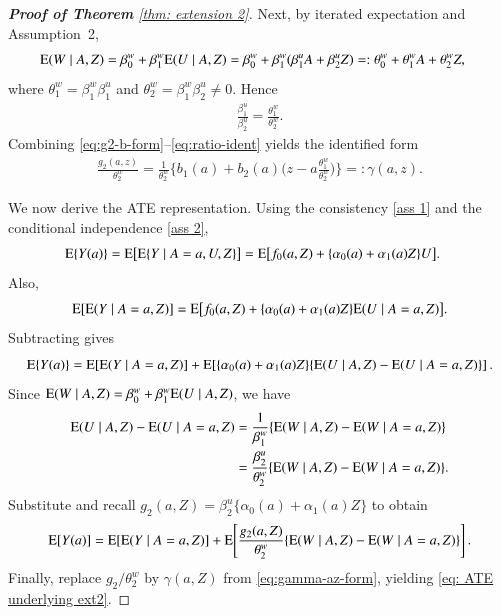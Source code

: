 \begin{proof}[\hypertarget{proof of thm extension 2}{\textbf{Proof of Theorem}} \ref{thm: extension 2}]
Next, by iterated expectation and Assumption~2,
\begin{align*}
\mathrm{E}(W\mid A,Z)
&=\beta_0^w+\beta_1^w\mathrm{E}(U\mid A,Z)
=\beta_0^w+\beta_1^w(\beta_1^u A+\beta_2^u Z)
=:\theta_0^w+\theta_1^wA+\theta_2^w Z,
\end{align*}
where $\theta_1^w=\beta_1^w\beta_1^u$ and $\theta_2^w=\beta_1^w\beta_2^u\neq 0$.
Hence
\begin{align}
\frac{\beta_1^u}{\beta_2^u}=\frac{\theta_1^w}{\theta_2^w}.
\label{eq:ratio-ident}
\end{align}
Combining \eqref{eq:g2-b-form}--\eqref{eq:ratio-ident} yields the identified form
\begin{align}
\frac{g_2(a,z)}{\theta_2^w}
=
\frac{1}{\theta_2^w}\Big\{ b_1(a)+b_2(a)\Big(z-a\frac{\theta_1^w}{\theta_2^w}\Big)\Big\}
=: \gamma(a,z).
\label{eq:gamma-az-form}
\end{align}

We now derive the ATE representation. Using the consistency \ref{ass 1} and the conditional independence \ref{ass 2},
\begin{align*}
\mathrm{E}\{Y(a)\}
&=\mathrm{E}\big[\mathrm{E}\{Y\mid A=a,U,Z\}\big]
=\mathrm{E}\big[f_0(a,Z)+\{\alpha_0(a)+\alpha_1(a)Z\}U\big].
\end{align*}
Also,
\[
\mathrm{E}[\mathrm{E}(Y\mid A=a,Z)]
=\mathrm{E}\big[f_0(a,Z)+\{\alpha_0(a)+\alpha_1(a)Z\}\mathrm{E}(U\mid A=a,Z)\big].
\]
Subtracting gives
\[
\mathrm{E}\{Y(a)\}
=
\mathrm{E}[\mathrm{E}(Y\mid A=a,Z)]
+
\mathrm{E}\!\left[\{\alpha_0(a)+\alpha_1(a)Z\}\{\mathrm{E}(U\mid A,Z)-\mathrm{E}(U\mid A=a,Z)\}\right].
\]
Since $\mathrm{E}(W\mid A,Z)=\beta_0^w+\beta_1^w\mathrm{E}(U\mid A,Z)$, we have
\begin{align*}
\mathrm{E}(U\mid A,Z)-\mathrm{E}(U\mid A=a,Z)
&=
\frac{1}{\beta_1^w}\{\mathrm{E}(W\mid A,Z)-\mathrm{E}(W\mid A=a,Z)\} \\
&=
\frac{\beta_2^u}{\theta_2^w}\{\mathrm{E}(W\mid A,Z)-\mathrm{E}(W\mid A=a,Z)\}.
\end{align*}
Substitute and recall $g_2(a,Z)=\beta_2^u\{\alpha_0(a)+\alpha_1(a)Z\}$ to obtain
\[
\mathrm{E} [Y(a)]
=
\mathrm{E}[\mathrm{E}(Y\mid A=a,Z)]
+
\mathrm{E}\!\left[
\frac{g_2(a,Z)}{\theta_2^w}
\{\mathrm{E}(W\mid A,Z)-\mathrm{E}(W\mid A=a,Z)\}
\right].
\]
Finally, replace $g_2/\theta_2^w$ by $\gamma(a,Z)$ from \eqref{eq:gamma-az-form}, yielding \eqref{eq: ATE underlying ext2}.


\end{proof}
